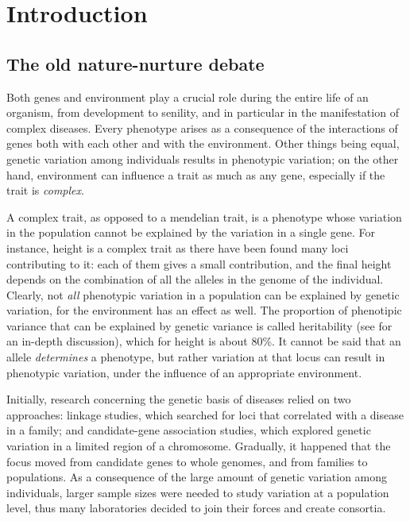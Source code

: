 \documentclass[../main.tex]{subfiles}
\begin{document}
\chapter{Introduction}

\section{The old nature-nurture debate}

Both genes and environment play a crucial role during the entire life of 
an organism, from development to senility, and in particular in the 
manifestation of complex diseases. Every phenotype arises as a 
consequence of the interactions of genes both with each other and with 
the environment. Other things being equal, genetic variation among 
individuals\autocite{Auton2015} results in phenotypic variation; on the 
other hand, environment can influence a trait as much as any gene, 
especially if the trait is \textit{complex}.

A complex trait, as opposed to a mendelian trait, is a phenotype whose 
variation in the population cannot be explained by the variation in a 
single gene. For instance, height is a complex trait as there have been 
found many loci contributing to it: each of them gives a small 
contribution, and the final height depends on the combination of all the 
alleles in the genome of the individual. Clearly, not \textit{all} 
phenotypic variation in a population can be explained by genetic 
variation, for the environment has an effect as well. The proportion of 
phenotipic variance that can be explained by genetic variance is called 
heritability (see  for an in-depth discussion), 
which for height is about 80\%\autocite{Visscher2008a}. It cannot be 
said that an allele \textit{determines} a phenotype, but rather 
variation at that locus can result in phenotypic variation, under the 
influence of an appropriate environment.

Initially, research concerning the genetic basis of diseases relied on 
two approaches: linkage studies, which searched for loci that correlated 
with a disease in a family; and candidate-gene association studies, 
which explored genetic variation in a limited region of a chromosome. 
Gradually, it happened that the focus moved from candidate genes to 
whole genomes, and from families to populations. As a consequence of the 
large amount of genetic variation among individuals, larger sample sizes 
were needed to study variation at a population level, thus many 
laboratories decided to join their forces and create consortia.
\end{document}
